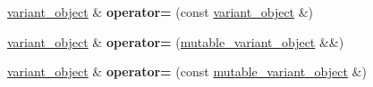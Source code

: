 \begin{DoxyCompactItemize}
\mbox{\hyperlink{classfc_1_1variant__object}{variant\+\_\+object}} \& {\bfseries operator=} (const \mbox{\hyperlink{classfc_1_1variant__object}{variant\+\_\+object}} \&)
\item 
\mbox{\label{classfc_1_1variant__object_a8b1e8f4915247c5a2bdcb73500d7f500}} 
\mbox{\hyperlink{classfc_1_1variant__object}{variant\+\_\+object}} \& {\bfseries operator=} (\mbox{\hyperlink{classfc_1_1mutable__variant__object}{mutable\+\_\+variant\+\_\+object}} \&\&)
\item 
\mbox{\label{classfc_1_1variant__object_a96520c61594003f59d0e507b013949cf}} 
\mbox{\hyperlink{classfc_1_1variant__object}{variant\+\_\+object}} \& {\bfseries operator=} (const \mbox{\hyperlink{classfc_1_1mutable__variant__object}{mutable\+\_\+variant\+\_\+object}} \&)
\end{DoxyCompactItemize}
